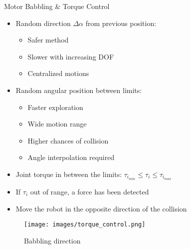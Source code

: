 \documentclass[aspectratio=169]{beamer}
\begin{document}
\begin{frame}{Motor Babbling \& Torque Control}
	\begin{minipage}{0.42\linewidth}
		\begin{itemize}
			\item Random direction \textcolor{hbrsblue}{\textbf{$\Delta \alpha$}} from previous position:
			\begin{itemize}
				\item Safer method
				\item Slower with increasing DOF
				\item Centralized motions
			\end{itemize}
			\hfill
			
			\item Random angular position between limits:
			\begin{itemize}
				\item Faster exploration
				\item Wide motion range
				\item Higher chances of collision
				\item Angle interpolation required
			\end{itemize}
		\end{itemize}
	\end{minipage}	
	\begin{minipage}{0.28\linewidth}	
		\begin{itemize}
			\item Joint torque in between the limits: \textcolor{hbrsblue}{$\tau_{i_{min}} \leq \tau_i \leq \tau_{i_{max}}$}
			\newline
			\item If \textcolor{hbrsblue}{$\tau_i$} out of range, a force has been detected
			\newline
			\item Move the robot in the opposite direction of the collision
		\end{itemize}
	\end{minipage}	
	\begin{minipage}{0.28\linewidth}
		\begin{figure}[h!]
			\texttt{[image: images/torque\_control.png]}
			\caption{Babbling direction}
			\label{fig:qt_joint_references}
		\end{figure}
		
	\end{minipage}
\end{frame}
\end{document}
